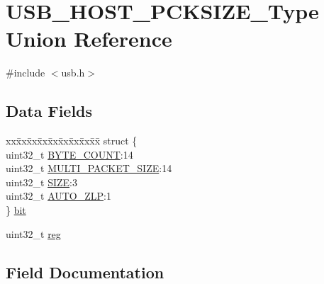 \hypertarget{union_u_s_b___h_o_s_t___p_c_k_s_i_z_e___type}{}\section{U\+S\+B\+\_\+\+H\+O\+S\+T\+\_\+\+P\+C\+K\+S\+I\+Z\+E\+\_\+\+Type Union Reference}
\label{union_u_s_b___h_o_s_t___p_c_k_s_i_z_e___type}


{\ttfamily \#include $<$usb.\+h$>$}

\subsection*{Data Fields}
\begin{DoxyCompactItemize}
\item 
\begin{tabbing}
xx\=xx\=xx\=xx\=xx\=xx\=xx\=xx\=xx\=\kill
struct \{\\
\>uint32\_t \mbox{\hyperlink{union_u_s_b___h_o_s_t___p_c_k_s_i_z_e___type_a3694230a55acd0de8c0a0fad3d338c41}{BYTE\_COUNT}}:14\\
\>uint32\_t \mbox{\hyperlink{union_u_s_b___h_o_s_t___p_c_k_s_i_z_e___type_ab48f28a6fa6fe58d13d3ba34a52a44b1}{MULTI\_PACKET\_SIZE}}:14\\
\>uint32\_t \mbox{\hyperlink{union_u_s_b___h_o_s_t___p_c_k_s_i_z_e___type_a8aff32858d38b4e185cc0bfcb3926c04}{SIZE}}:3\\
\>uint32\_t \mbox{\hyperlink{union_u_s_b___h_o_s_t___p_c_k_s_i_z_e___type_af3fb7c35c6a108c18d85160f75977586}{AUTO\_ZLP}}:1\\
\} \mbox{\hyperlink{union_u_s_b___h_o_s_t___p_c_k_s_i_z_e___type_a7f02167bb4c74b6d081cfca020d86d2b}{bit}}\\

\end{tabbing}\item 
uint32\+\_\+t \mbox{\hyperlink{union_u_s_b___h_o_s_t___p_c_k_s_i_z_e___type_a6b91636401516a477989a336376d7b40}{reg}}
\end{DoxyCompactItemize}


\subsection{Field Documentation}
\mbox{\label{union_u_s_b___h_o_s_t___p_c_k_s_i_z_e___type_af3fb7c35c6a108c18d85160f75977586}} 
